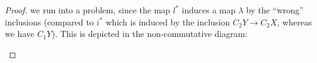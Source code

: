 \begin{proof}
	we run into a problem, since the map $l^*$ induces a map $\lambda$ by the “wrong” inclusions (compared to $i^*$ which is induced by the inclusion $C_2Y\to C_2X$, whereas we have $C_1Y$). This is depicted in the non-commutative diagram:
	\begin{center}
	\end{center}
	


\end{proof}

